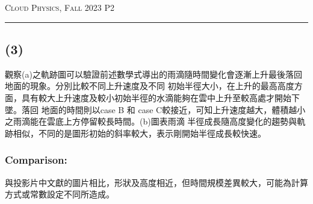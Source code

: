 \documentclass{article}
\begin{document}
\begin{CJK*}{UTF8}{bsmi}
\newpage
\thispagestyle{empty}
\hfill {\scshape \large Cloud Physics, Fall 2023 } \hfill {\scshape P2}
\smallskip
\hrule
\bigskip
\subsection*{(3)}
    \begin{spacing}{1.5}
        \begin{large}
            觀察(a)之軌跡圖可以驗證前述數學式導出的雨滴隨時間變化會逐漸上升最後落回地面的現象。分別比較不同上升速度及不同
            初始半徑大小，在上升的最高高度方面，具有較大上升速度及較小初始半徑的水滴能夠在雲中上升至較高處才開始下墜。落回
            地面的時間則以case B 和 case C較接近，可知上升速度越大，體積越小之雨滴能在雲底上方停留較長時間。(b)圖表雨滴
            半徑成長隨高度變化的趨勢與軌跡相似，不同的是圖形初始的斜率較大，表示剛開始半徑成長較快速。
        \end{large}
    \end{spacing}
\subsubsection*{Comparison:}
    \begin{spacing}{1.5}
        \begin{large}
            與投影片中文獻的圖片相比，形狀及高度相近，但時間規模差異較大，可能為計算方式或常數設定不同所造成。
        \end{large}
    \end{spacing}
    




\end{CJK*}
\end{document}
